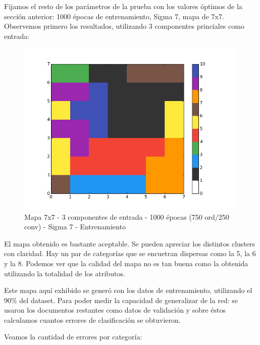 Fijamos el resto de los parámetros de la prueba con los valores óptimos de la sección anterior: 1000 épocas de entrenamiento, Sigma 7, mapa de 7x7.\\

Observemos primero los resultados, utilizando 3 componentes princiales como entrada:

\begin{figure}[!htbp]
  \begin{center}
    \includegraphics[scale=0.6]{../img/map7x7_1000ep_3en_sigma7_faseord750.png}
  \caption{Mapa 7x7 - 3 componentes de entrada - 1000 épocas (750 ord/250 conv) - Sigma 7 - Entrenamiento}
  \end{center}
\end{figure}

El mapa obtenido es bastante aceptable. Se pueden apreciar los distintos clusters con claridad. Hay un par de categorías que se encuetran dispersas como la 5, la 6 y la 8.
Podemos ver que la calidad del mapa no es tan buena como la obtenida utilizando la totalidad de los atributos.

Este mapa aquí exhibido se generó con los datos de entrenamiento, utilizando el 90\% del dataset. Para poder medir la capacidad de generalizar de la red: se usaron los documentos restantes  como datos de validación y sobre éstos calculamos cuantos errores de clasificación se obtuvieron. 

Veamos la cantidad de errores por categoría:

\newpage

